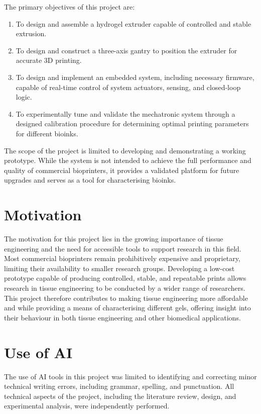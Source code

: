 The primary objectives of this project are:
\begin{enumerate}
    \item To design and assemble a hydrogel extruder capable of controlled and stable extrusion.
    \item To design and construct a three-axis gantry to position the extruder for accurate 3D printing.
    \item To design and implement an embedded system, including necessary firmware, capable of real-time control of system actuators, sensing, and closed-loop logic.
    \item To experimentally tune and validate the mechatronic system through a designed calibration procedure for determining optimal printing parameters for different bioinks.
\end{enumerate}

The scope of the project is limited to developing and demonstrating a working prototype. While the system is not intended to achieve the full performance and quality of commercial bioprinters, it provides a validated platform for future upgrades and serves as a tool for characterising bioinks.

\section{Motivation}

The motivation for this project lies in the growing importance of tissue engineering and the need for accessible tools to support research in this field. Most commercial bioprinters remain prohibitively expensive and proprietary, limiting their availability to smaller research groups. Developing a low-cost prototype capable of producing controlled, stable, and repeatable prints allows research in tissue engineering to be conducted by a wider range of researchers. This project therefore contributes to making tissue engineering more affordable and while providing a means of characterising different gels, offering insight into their behaviour in both tissue engineering and other biomedical applications.

\section{Use of AI}
The use of AI tools in this project was limited to identifying and correcting minor technical writing errors, including grammar, spelling, and punctuation. All technical aspects of the project, including the literature review, design, and experimental analysis, were independently performed.